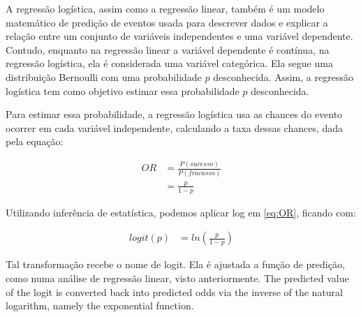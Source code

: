 A regressão logística, assim como a regressão linear, também é um modelo matemático de predição de eventos usada para descrever dados e explicar a relação entre um conjunto de variáveis independentes e uma variável dependente. Contudo, enquanto na regressão linear a variável dependente é contínua, na regressão logística, ela é considerada uma variável categórica. Ela segue uma distribuição Bernoulli\footnotemark {} com uma probabilidade \begin{math}p\end{math} desconhecida. Assim, a regressão logística tem como objetivo estimar essa probabilidade \begin{math}p\end{math} desconhecida.

Para estimar essa probabilidade, a regressão logística usa as chances do evento ocorrer em cada variável independente, calculando a taxa dessas chances, dada pela equação:

\begin{equation}
  \label{eq:OR}
  \begin{aligned}
   OR &= \frac{P(sucesso)}{P(fracasso)}\\
     &= \frac{p}{1-p}
  \end{aligned}
\end{equation}

Utilizando inferência de estatística, podemos aplicar log em \ref{eq:OR}, ficando com:

\begin{equation}
  \label{eq:t}
  \begin{aligned}
    logit(p) &= ln\left ( \frac{p}{1-p} \right )
  \end{aligned}
\end{equation}

Tal transformação recebe o nome de logit. Ela é ajustada a função de predição, como numa análise de regressão linear, visto anteriormente. The predicted value of the logit is converted back into predicted odds via the inverse of the natural logarithm, namely the exponential function.

